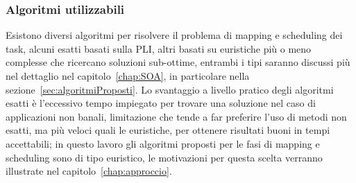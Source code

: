 \subsubsection{Algoritmi utilizzabili} Esistono diversi algoritmi per risolvere
il problema di mapping e scheduling dei task, alcuni esatti basati sulla
\ac{PLI}, altri basati su euristiche più o meno complesse che ricercano
soluzioni sub-ottime, entrambi i tipi saranno discussi più nel dettaglio nel
capitolo~\ref{chap:SOA}, in particolare nella
sezione~\ref{sec:algoritmiProposti}.  Lo svantaggio a livello pratico degli
algoritmi esatti è l'eccessivo tempo impiegato per trovare una soluzione nel caso di
applicazioni non banali, limitazione che tende a far preferire l'uso di metodi
non esatti, ma più veloci quali le euristiche, per ottenere risultati buoni in
tempi accettabili; in questo lavoro gli algoritmi proposti per le fasi di
mapping e scheduling sono di tipo euristico, le motivazioni per questa scelta verranno
illustrate nel capitolo~\ref{chap:approccio}.

